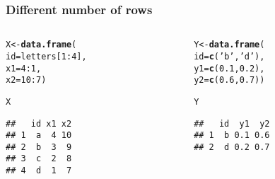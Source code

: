 \documentclass[12pt]{beamer}\usepackage[]{graphicx}\usepackage[]{color}
\makeatletter
\newcommand{\hlnum}[1]{\textcolor[rgb]{0.686,0.059,0.569}{#1}}%
\newcommand{\hlstr}[1]{\textcolor[rgb]{0.192,0.494,0.8}{#1}}%
\newcommand{\hlopt}[1]{\textcolor[rgb]{0,0,0}{#1}}%
\newcommand{\hlstd}[1]{\textcolor[rgb]{0.345,0.345,0.345}{#1}}%
\newcommand{\hlkwb}[1]{\textcolor[rgb]{0.69,0.353,0.396}{#1}}%
\newcommand{\hlkwc}[1]{\textcolor[rgb]{0.333,0.667,0.333}{#1}}%
\newcommand{\hlkwd}[1]{\textcolor[rgb]{0.737,0.353,0.396}{\textbf{#1}}}%
\newenvironment{kframe}{%
 \def\at@end@of@kframe{}%
 \ifinner\ifhmode%
  \def\at@end@of@kframe{\end{minipage}}%
  \begin{minipage}{\columnwidth}%
 \fi\fi%
 \def\FrameCommand##1{\hskip\@totalleftmargin \hskip-\fboxsep
 \colorbox{shadecolor}{##1}\hskip-\fboxsep
     \hskip-\linewidth \hskip-\@totalleftmargin \hskip\columnwidth}%
 \MakeFramed {\advance\hsize-\width
   \@totalleftmargin\z@ \linewidth\hsize
   \@setminipage}}%
 {\par\unskip\endMakeFramed%
 \at@end@of@kframe}
\newenvironment{knitrout}{}{} %
\makeatother
\begin{document}
\begin{frame}[fragile]
\frametitle{Different number of rows}

\begin{columns}[t]
\begin{column}{0.4\textwidth}
\begin{knitrout}\footnotesize
{}\color{fgcolor}\begin{kframe}
\begin{alltt}
\hlstd{X} \hlkwb{<-} \hlkwd{data.frame}\hlstd{(}
  \hlkwc{id} \hlstd{= letters[}\hlnum{1}\hlopt{:}\hlnum{4}\hlstd{],}
  \hlkwc{x1} \hlstd{=} \hlnum{4}\hlopt{:}\hlnum{1}\hlstd{,}
  \hlkwc{x2} \hlstd{=} \hlnum{10}\hlopt{:}\hlnum{7}\hlstd{)}

\hlstd{X}
\end{alltt}
\begin{verbatim}
##   id x1 x2
## 1  a  4 10
## 2  b  3  9
## 3  c  2  8
## 4  d  1  7
\end{verbatim}
\end{kframe}
\end{knitrout}
\end{column}

\begin{column}{0.5\textwidth}
\begin{knitrout}\footnotesize
{}\color{fgcolor}\begin{kframe}
\begin{alltt}
\hlstd{Y} \hlkwb{<-} \hlkwd{data.frame}\hlstd{(}
  \hlkwc{id} \hlstd{=} \hlkwd{c}\hlstd{(}\hlstr{'b'}\hlstd{,} \hlstr{'d'}\hlstd{),}
  \hlkwc{y1} \hlstd{=} \hlkwd{c}\hlstd{(}\hlnum{0.1}\hlstd{,} \hlnum{0.2}\hlstd{),}
  \hlkwc{y2} \hlstd{=} \hlkwd{c}\hlstd{(}\hlnum{0.6}\hlstd{,} \hlnum{0.7}\hlstd{))}

\hlstd{Y}
\end{alltt}
\begin{verbatim}
##   id  y1  y2
## 1  b 0.1 0.6
## 2  d 0.2 0.7
\end{verbatim}
\end{kframe}
\end{knitrout}
\end{column}
\end{columns}

\end{frame}

\end{document}
